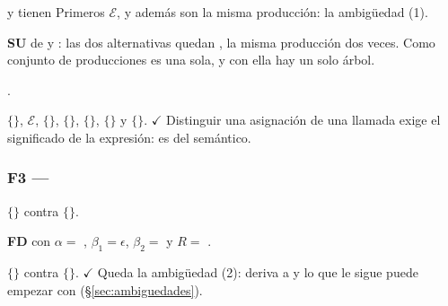 \documentclass[12pt,a4paper]{article}
\newcommand{\cE}{\ensuremath{\mathcal{E}}}
\newcommand{\cj}[1]{\ensuremath{\{}#1\ensuremath{\}}}
\newcommand{\tec}[1]{\textsf{\bfseries #1}}
\newcommand{\ok}{\ensuremath{\checkmark}}
\begin{document}
\begin{producciones}
\end{producciones}
  \tl{;} y  \tl{;} tienen Primeros \cE{}, y además son la
misma producción: la ambigüedad (1).

 \tec{SU} de  y : las dos alternativas quedan
 \tl{;}, la misma producción dos veces. Como conjunto de producciones es una sola, y con
ella hay un solo árbol.

\paso{Paso 2 (\tec{AG}).} .

\begin{producciones}
\end{producciones}
\cj{\tl{;}}, \cE, \cj{}, \cj{}, \cj{}, \cj{} y \cj{\tl{\{}}. \ok{}
Distinguir una asignación de una llamada exige el significado de la expresión: es del semántico.

\subsubsection*{F3 --- }

\begin{producciones}
\end{producciones}
 \cj{} contra \cj{\tl{if}}.

 \tec{FD} con $\alpha =$  \tl{(}  \tl{)} ,
$\beta_1 = \epsilon$, $\beta_2 =$   y $R =$ .

\begin{producciones}
\end{producciones}
\cj{} contra \cj{\eps}. \ok{} Queda la ambigüedad (2):  deriva a \eps{} y lo
que le sigue puede empezar con  (§\ref{sec:ambiguedades}).
\end{document}
